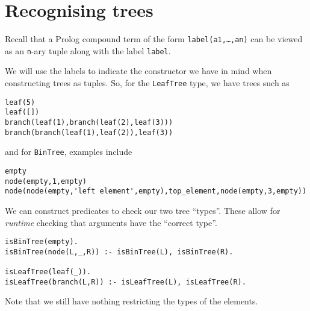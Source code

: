 \documentclass[11pt]{article}
\begin{document}
\section{Recognising trees}
\label{sec:org07d3ac7}
Recall that
a Prolog compound term of the form \texttt{label(a1,…,an)} can be viewed
as an \texttt{n}-ary tuple along with the label \texttt{label}.

We will use the labels to indicate the constructor we have in mind
when constructing trees as tuples.
So, for the \texttt{LeafTree} type, we have trees such as
\begin{verbatim}
leaf(5)
leaf([])
branch(leaf(1),branch(leaf(2),leaf(3)))
branch(branch(leaf(1),leaf(2)),leaf(3))
\end{verbatim}
and for \texttt{BinTree}, examples include
\begin{verbatim}
empty
node(empty,1,empty)
node(node(empty,'left element',empty),top_element,node(empty,3,empty))
\end{verbatim}

We can construct predicates to check our two tree “types”.
These allow for \emph{runtime} checking that arguments have the “correct type”. 
\begin{verbatim}
isBinTree(empty).
isBinTree(node(L,_,R)) :- isBinTree(L), isBinTree(R).

isLeafTree(leaf(_)).
isLeafTree(branch(L,R)) :- isLeafTree(L), isLeafTree(R).
\end{verbatim}
Note that we still have nothing restricting the types of the elements.
\end{document}
